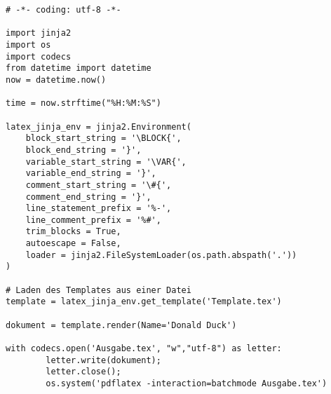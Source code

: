 \documentclass{article}
\begin{document}
\begin{verbatim}
# -*- coding: utf-8 -*-

import jinja2
import os
import codecs
from datetime import datetime
now = datetime.now()

time = now.strftime("%H:%M:%S")

latex_jinja_env = jinja2.Environment(
    block_start_string = '\BLOCK{',
    block_end_string = '}',
    variable_start_string = '\VAR{',
    variable_end_string = '}',
    comment_start_string = '\#{',
    comment_end_string = '}',
    line_statement_prefix = '%-',
    line_comment_prefix = '%#',
    trim_blocks = True,
    autoescape = False,
    loader = jinja2.FileSystemLoader(os.path.abspath('.'))
)

# Laden des Templates aus einer Datei
template = latex_jinja_env.get_template('Template.tex')

dokument = template.render(Name='Donald Duck')

with codecs.open('Ausgabe.tex', "w","utf-8") as letter:
        letter.write(dokument);
        letter.close();
        os.system('pdflatex -interaction=batchmode Ausgabe.tex')



\end{verbatim}
\end{document}
